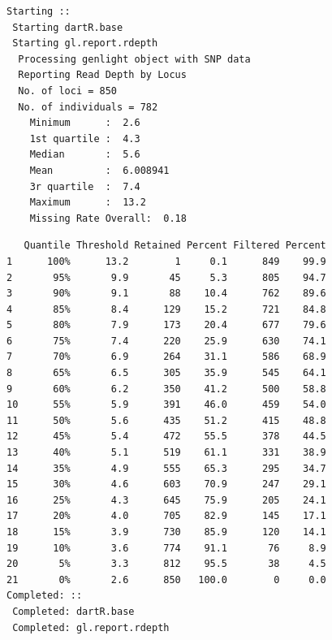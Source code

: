 \documentclass[
  letterpaper,
  DIV=11,
  numbers=noendperiod]{scrreprt}
\newenvironment{Shaded}{\begin{snugshade}}{\end{snugshade}}
\newcommand{\CommentTok}[1]{\textcolor[rgb]{0.38,0.63,0.69}{\textit{#1}}}
\newcommand{\FunctionTok}[1]{\textcolor[rgb]{0.02,0.16,0.49}{#1}}
\newcommand{\NormalTok}[1]{\textcolor[rgb]{0.00,0.44,0.13}{#1}}
\newcommand{\SpecialCharTok}[1]{\textcolor[rgb]{0.25,0.44,0.63}{#1}}
\let\textttOrig\texttt
\renewcommand{\texttt}[1]{\textttOrig{\color{blue}{#1}}}
\begin{document}
\begin{figure}[H]

{\centering \texttt{[image: Session10\_SexLinkedMarkers\_files/figure-pdf/unnamed-chunk-14-4.pdf]}

}

\end{figure}

\begin{Shaded}
\end{Shaded}

\begin{verbatim}
Starting :: 
 Starting dartR.base 
 Starting gl.report.rdepth 
  Processing genlight object with SNP data
  Reporting Read Depth by Locus
  No. of loci = 850 
  No. of individuals = 782 
    Minimum      :  2.6 
    1st quartile :  4.3 
    Median       :  5.6 
    Mean         :  6.008941 
    3r quartile  :  7.4 
    Maximum      :  13.2 
    Missing Rate Overall:  0.18 
\end{verbatim}

\begin{figure}[H]

{\centering \texttt{[image: Session10\_SexLinkedMarkers\_files/figure-pdf/unnamed-chunk-14-5.pdf]}

}

\end{figure}

\begin{verbatim}
   Quantile Threshold Retained Percent Filtered Percent
1      100%      13.2        1     0.1      849    99.9
2       95%       9.9       45     5.3      805    94.7
3       90%       9.1       88    10.4      762    89.6
4       85%       8.4      129    15.2      721    84.8
5       80%       7.9      173    20.4      677    79.6
6       75%       7.4      220    25.9      630    74.1
7       70%       6.9      264    31.1      586    68.9
8       65%       6.5      305    35.9      545    64.1
9       60%       6.2      350    41.2      500    58.8
10      55%       5.9      391    46.0      459    54.0
11      50%       5.6      435    51.2      415    48.8
12      45%       5.4      472    55.5      378    44.5
13      40%       5.1      519    61.1      331    38.9
14      35%       4.9      555    65.3      295    34.7
15      30%       4.6      603    70.9      247    29.1
16      25%       4.3      645    75.9      205    24.1
17      20%       4.0      705    82.9      145    17.1
18      15%       3.9      730    85.9      120    14.1
19      10%       3.6      774    91.1       76     8.9
20       5%       3.3      812    95.5       38     4.5
21       0%       2.6      850   100.0        0     0.0
Completed: :: 
 Completed: dartR.base 
 Completed: gl.report.rdepth 
\end{verbatim}
\end{document}
